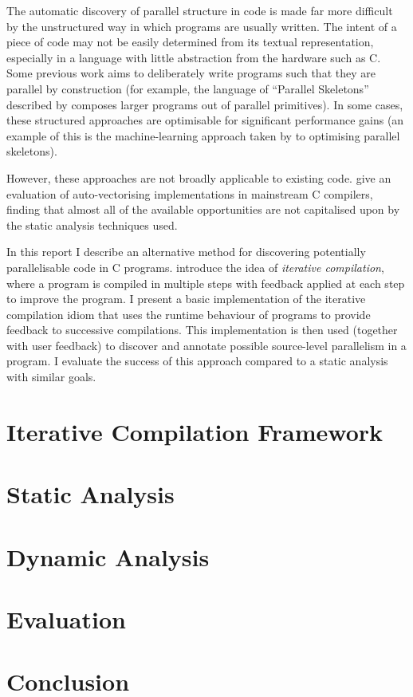 \documentclass[journal]{IEEEtran}
\begin{document}
The automatic discovery of parallel structure in code is made far more difficult
by the unstructured way in which programs are usually written.  The intent of a
piece of code may not be easily determined from its textual representation,
especially in a language with little abstraction from the hardware such as C.
Some previous work aims to deliberately write programs such that they are
parallel by construction (for example, the language of ``Parallel Skeletons''
described by \textcite{gorlatch_parallel_2011} composes larger programs out of
parallel primitives). In some cases, these structured approaches are optimisable
for significant performance gains (an example of this is the machine-learning
approach taken by \textcite{collins_masif:_2013} to optimising parallel
skeletons).

However, these approaches are not broadly applicable to existing code.
\textcite{maleki_evaluation_2011} give an evaluation of auto-vectorising
implementations in mainstream C compilers, finding that almost all of the
available opportunities are not capitalised upon by the static analysis
techniques used.

In this report I describe an alternative method for discovering potentially
parallelisable code in C programs. \textcite{fursin_evaluating_2002} introduce
the idea of \emph{iterative compilation}, where a program is compiled in
multiple steps with feedback applied at each step to improve the program. I
present a basic implementation of the iterative compilation idiom that uses the
runtime behaviour of programs to provide feedback to successive compilations.
This implementation is then used (together with user feedback) to discover and
annotate possible source-level parallelism in a program. I evaluate the success
of this approach compared to a static analysis with similar goals.

\section{Iterative Compilation Framework}

\section{Static Analysis}

\section{Dynamic Analysis}

\section{Evaluation}

\section{Conclusion}

\ifCLASSOPTIONcaptionsoff
  \newpage
\fi

\printbibliography
\end{document}
